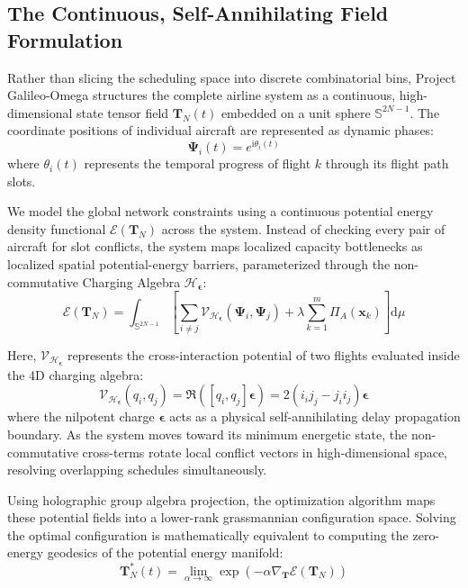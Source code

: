 \documentclass[11pt,a4paper]{book}
\begin{document}
\subsection{The Continuous, Self-Annihilating Field Formulation}

Rather than slicing the scheduling space into discrete combinatorial bins, Project Galileo-Omega structures the complete airline system as a continuous, high-dimensional state tensor field $\mathbf{T}_N(t)$ embedded on a unit sphere $\mathbb{S}^{2N-1}$. The coordinate positions of individual aircraft are represented as dynamic phases:
\begin{equation}
\label{eq:sphere_embedding}
\mathbf{\Psi}_i(t) = e^{\mathrm{i} \theta_i(t)}
\end{equation}
where $\theta_i(t)$ represents the temporal progress of flight $k$ through its flight path slots.

We model the global network constraints using a continuous potential energy density functional $\mathcal{E}(\mathbf{T}_N)$ across the system. Instead of checking every pair of aircraft for slot conflicts, the system maps localized capacity bottlenecks as localized spatial potential-energy barriers, parameterized through the non-commutative Charging Algebra $\mathcal{H}_{\bm{\epsilon}}$:
\begin{equation}
\label{eq:potential_functional}
\mathcal{E}(\mathbf{T}_N) = \int_{\mathbb{S}^{2N-1}} \left[ \sum_{i \neq j} \mathcal{V}_{\mathcal{H}_{\bm{\epsilon}}}(\mathbf{\Psi}_i, \mathbf{\Psi}_j) + \lambda \sum_{k=1}^m \Pi_A(\mathbf{x}_k) \right] \mathrm{d}\mu
\end{equation}

Here, $\mathcal{V}_{\mathcal{H}_{\bm{\epsilon}}}$ represents the cross-interaction potential of two flights evaluated inside the 4D charging algebra:
\begin{equation}
\label{eq:interaction_term}
\mathcal{V}_{\mathcal{H}_{\bm{\epsilon}}}(q_i, q_j) = \Re \left( [q_i, q_j] \bm{\epsilon} \right) = 2 \left( i_i j_j - j_i i_j \right) \bm{\epsilon}
\end{equation}
where the nilpotent charge $\bm{\epsilon}$ acts as a physical self-annihilating delay propagation boundary. As the system moves toward its minimum energetic state, the non-commutative cross-terms rotate local conflict vectors in high-dimensional space, resolving overlapping schedules simultaneously.

Using holographic group algebra projection, the optimization algorithm maps these potential fields into a lower-rank grassmannian configuration space. Solving the optimal configuration is mathematically equivalent to computing the zero-energy geodesics of the potential energy manifold:
\begin{equation}
\label{eq:geodesic_flow}
\mathbf{T}_N^*(t) = \lim_{\alpha \to \infty} \exp(-\alpha \nabla_{\mathbf{T}} \mathcal{E}(\mathbf{T}_N))
\end{equation}
\end{document}
